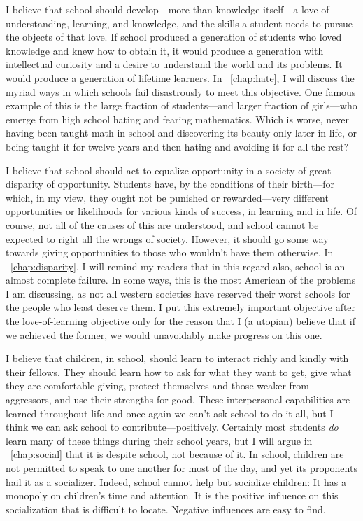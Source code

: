 \documentclass[11pt]{book}
\begin{document}
I believe that school should develop---more than knowledge itself---a
love of understanding, learning, and knowledge, and the skills a
student needs to pursue the objects of that love.  If school produced
a generation of students who loved knowledge and knew how to obtain
it, it would produce a generation with intellectual curiosity and a
desire to understand the world and its problems.  It would produce a
generation of lifetime learners.  In \chaptername~\ref{chap:hate}, I
will discuss the myriad ways in which schools fail disastrously to
meet this objective.  One famous example of this is the large fraction
of students---and larger fraction of girls---who emerge from high
school hating and fearing mathematics.  Which is worse, never having
been taught math in school and discovering its beauty only later in
life, or being taught it for twelve years and then hating and avoiding
it for all the rest?

I believe that school should act to equalize opportunity in a society
of great disparity of opportunity.  Students have, by the conditions
of their birth---for which, in my view, they ought not be punished or
rewarded---very different opportunities or likelihoods for various
kinds of success, in learning and in life.  Of course, not all of the
causes of this are understood, and school cannot be expected to right
all the wrongs of society.  However, it should go some way towards
giving opportunities to those who wouldn't have them otherwise.  In
\chaptername~\ref{chap:disparity}, I will remind my readers that in
this regard also, school is an almost complete failure.  In some ways,
this is the most American of the problems I am discussing, as not all
western societies have reserved their worst schools for the people who
least deserve them.  I put this extremely important objective after
the love-of-learning objective only for the reason that I (a utopian)
believe that if we achieved the former, we would unavoidably make
progress on this one.

I believe that children, in school, should learn to interact richly
and kindly with their fellows.  They should learn how to ask for what
they want to get, give what they are comfortable giving, protect
themselves and those weaker from aggressors, and use their strengths
for good.  These interpersonal capabilities are learned throughout
life and once again we can't ask school to do it all, but I think we
can ask school to contribute---positively.  Certainly most students
\emph{do} learn many of these things during their school years, but I
will argue in \chaptername~\ref{chap:social} that it is despite
school, not because of it.  In school, children are not permitted to
speak to one another for most of the day, and yet its proponents hail
it as a socializer.  Indeed, school cannot help but socialize
children: It has a monopoly on children's time and attention.  It is
the positive influence on this socialization that is difficult to
locate.  Negative influences are easy to find.
\end{document}
